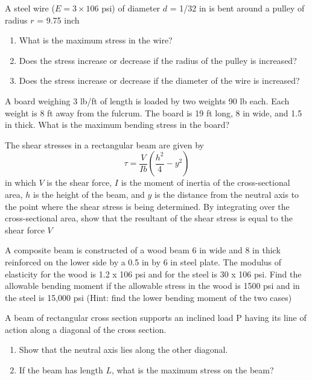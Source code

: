 \documentclass[
10pt,
a4paper,
openany,
svgnames,
]{book} %
\begin{document}
\begin{exercises}

  \exercise A steel wire ($E = 3 \times 106$ psi) of diameter $d$ = 1/32 in is bent around a pulley of radius $r$ = 9.75 inch
  \begin{enumerate}

  \item What is the maximum stress in the wire?
  \item Does the stress increase or decrease if the radius of the pulley is increased?
  \item Does the stress increase or decrease if the diameter of the wire is increased?

  \end{enumerate}

  \exercise A board weighing 3 lb/ft of length is loaded by two weights 90 lb each. Each weight is 8 ft away from the fulcrum. The board is 19 ft long, 8 in wide, and 1.5 in thick. What is the maximum bending stress in the board?

  \exercise The shear stresses in a rectangular beam are given by
  \[ \tau = \frac{V}{Ib} \left( \frac{h^2}{4} - y^2 \right) \]	
  in which $V$ is the shear force, $I$ is the moment of inertia of the cross-sectional area, $h$ is the height of the beam, and $y$ is the distance from the neutral axis to the point where the shear stress is being determined. By integrating over the cross-sectional area, show that the resultant of the shear stress is equal to the shear force $V$
  
  \exercise A composite beam is constructed of a wood beam 6 in wide and 8 in thick reinforced on the lower side by a 0.5 in by 6 in steel plate. The modulus of elasticity for the wood is 1.2 x 106 psi and for the steel is 30 x 106 psi. Find the allowable bending moment if the allowable stress in the wood is 1500 psi and in the steel is 15,000 psi (Hint: find the lower bending moment of the two cases)

  \exercise A beam of rectangular cross section supports an inclined load P having its line of action along a diagonal of the cross section.
  \begin{enumerate}
    
  \item Show that the neutral axis lies along the other diagonal.
  \item If the beam has length $L$, what is the maximum stress on the beam?

  \end{enumerate}
  

\end{exercises}
\end{document}
